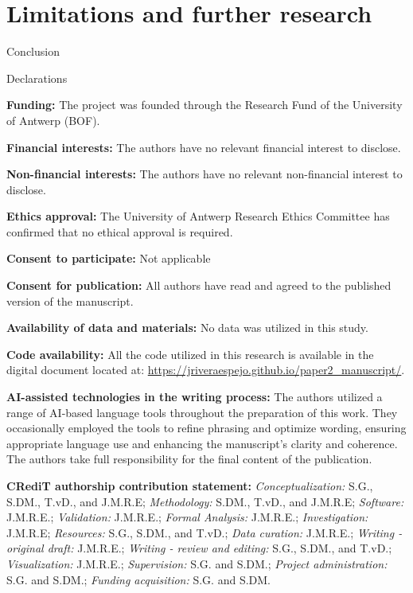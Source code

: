 \documentclass[
  authoryear,
  review,
  1p]{elsarticle}
\begin{document}
\section{Limitations and further
research}\label{sec-discuss-limitations}

Conclusion

\newpage{}

Declarations

\textbf{Funding:} The project was founded through the Research Fund of
the University of Antwerp (BOF).

\textbf{Financial interests:} The authors have no relevant financial
interest to disclose.

\textbf{Non-financial interests:} The authors have no relevant
non-financial interest to disclose.

\textbf{Ethics approval:} The University of Antwerp Research Ethics
Committee has confirmed that no ethical approval is required.

\textbf{Consent to participate:} Not applicable

\textbf{Consent for publication:} All authors have read and agreed to
the published version of the manuscript.

\textbf{Availability of data and materials:} No data was utilized in
this study.

\textbf{Code availability:} All the code utilized in this research is
available in the digital document located at:
\url{https://jriveraespejo.github.io/paper2_manuscript/}.

\textbf{AI-assisted technologies in the writing process:} The authors
utilized a range of AI-based language tools throughout the preparation
of this work. They occasionally employed the tools to refine phrasing
and optimize wording, ensuring appropriate language use and enhancing
the manuscript's clarity and coherence. The authors take full
responsibility for the final content of the publication.

\textbf{CRediT authorship contribution statement:}
\emph{Conceptualization:} S.G., S.DM., T.vD., and J.M.R.E;
\emph{Methodology:} S.DM., T.vD., and J.M.R.E; \emph{Software:}
J.M.R.E.; \emph{Validation:} J.M.R.E.; \emph{Formal Analysis:} J.M.R.E.;
\emph{Investigation:} J.M.R.E; \emph{Resources:} S.G., S.DM., and T.vD.;
\emph{Data curation:} J.M.R.E.; \emph{Writing - original draft:}
J.M.R.E.; \emph{Writing - review and editing:} S.G., S.DM., and T.vD.;
\emph{Visualization:} J.M.R.E.; \emph{Supervision:} S.G. and S.DM.;
\emph{Project administration:} S.G. and S.DM.; \emph{Funding
acquisition:} S.G. and S.DM.
\end{document}

